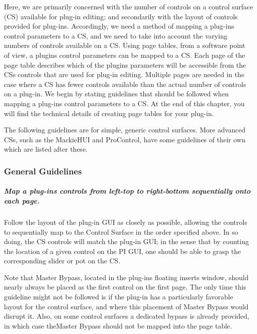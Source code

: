 Here, we are primarily concerned with the number of controls on a control surface (CS) available for plug-\/in editing; and secondarily with the layout of controls provided for plug-\/ins. Accordingly, we need a method of mapping a plug-\/in\textquotesingle{}s control parameters to a CS, and we need to take into account the varying numbers of controls available on a CS. Using \textquotesingle{}page tables\textquotesingle{}, from a software point of view, a plugin\textquotesingle{}s control parameters can be mapped to a CS. Each page of the page table describes which of the plugin\textquotesingle{}s parameters will be accessible from the CS\textquotesingle{}s controls that are used for plug-\/in editing. Multiple pages are needed in the case where a CS has fewer controls available than the actual number of controls on a plug-\/in. We begin by stating guidelines that should be followed when mapping a plug-\/in\textquotesingle{}s control parameters to a CS. At the end of this chapter, you will find the technical details of creating page tables for your plug-\/in.

The following guidelines are for simple, generic control surfaces. More advanced C\+Ss, such as the Mackie\+H\+UI and Pro\+Control, have some guidelines of their own which are listed after these.

\hypertarget{a00833_subsection__general_guidelines}{}\subsubsection{General Guidelines}\label{a00833_subsection__general_guidelines}
 \subparagraph*{Map a plug-\/in\textquotesingle{}s controls from left-\/top to right-\/bottom sequentially onto each page.}

  Follow the layout of the plug-\/in G\+UI as closely as possible, allowing the controls to sequentially map to the Control Surface in the order specified above. In so doing, the CS controls will match the plug-\/in G\+UI; in the sense that by counting the location of a given control on the PI G\+UI, one should be able to grasp the corresponding slider or pot on the CS.

 Note that Master Bypass, located in the plug-\/in\textquotesingle{}s floating inserts window, should nearly always be placed as the first control on the first page. The only time this guideline might not be followed is if the plug-\/in has a particularly favorable layout for the control surface, and where this placement of Master Bypass would disrupt it. Also, on some control surfaces a dedicated bypass is already provided, in which case the\+Master Bypass should not be mapped into the page table. 

